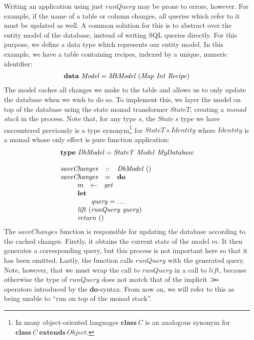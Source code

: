 Writing an application using just $\mathit{runQuery}$ may be prone to errors, however. For example, if the name of a table or column changes, all queries which refer to it must be updated as well. A common solution for this is to abstract over the entity model of the database, instead of writing SQL queries directly. For this purpose, we define a data type which represents our entity model. In this example, we have a table containing recipes, indexed by a unique, numeric identifier:
\begin{displaymath}
\begin{array}{lcl}
\multicolumn{3}{l}{\mathbf{data}~\mathit{Model} = \mathit{MkModel}~(\mathit{Map}~\mathit{Int}~\mathit{Recipe})}
\end{array}
\end{displaymath}
The model caches all changes we make to the table and allows us to only update the database when we wish to do so. To implement this, we layer the model on top of the database using the state monad transformer $\mathit{StateT}$, creating a \emph{monad stack} in the process. Note that, for any type $s$, the $\mathit{State}~s$ type we have encountered previously is a type synonym\footnote{
In many object-oriented languages $\textbf{class}~\mathit{C}$ is an analogous
synonym for $\textbf{class}~\mathit{C}~\mathbf{extends}~\mathit{Object}$.
}
for $\mathit{StateT}~s~\mathit{Identity}$ where $\mathit{Identity}$ is a monad
whose only effect is pure function application:
\begin{displaymath}
\begin{array}{lcl}
\multicolumn{3}{l}{\mathbf{type}~\mathit{DbModel} = \mathit{StateT}~\mathit{Model}~\mathit{MyDatabase}}\\\\
\mathit{saveChanges} & :: & \mathit{DbModel}~() \\
\mathit{saveChanges} & = & \mathbf{do} \\
\multicolumn{3}{l}{\qquad \begin{array}{lcl}
    m & \leftarrow & \mathit{get} \\
    \multicolumn{3}{l}{\mathbf{let}} \\
    \multicolumn{3}{l}{\qquad \mathit{query} = \ldots} \\
    \multicolumn{3}{l}{\mathit{lift}~(\mathit{runQuery}~\mathit{query})}\\
    \multicolumn{3}{l}{\mathit{return}~()}
\end{array} }
\end{array}
\end{displaymath}
The $\mathit{saveChanges}$ function is responsible for updating the database according to the cached changes. Firstly, it obtains the current state of the model $m$. It then generates a corresponding query, but this process is not important here so that it has been omitted. Lastly, the function calls $\mathit{runQuery}$ with the generated query. Note, however, that we must wrap the call to $\mathit{runQuery}$ in a call to $\mathit{lift}$, because otherwise the type of $\mathit{runQuery}$ does not match that of the implicit $\gg\!\!=$ operators introduced
by the $\mathbf{do}$-syntax.
From now on, we will refer to this as being unable to ``run on top of the monad stack''.

